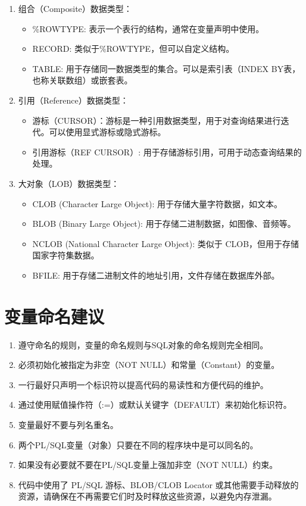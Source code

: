\documentclass[11pt, a4paper, oneside, UTF8]{ctexbook}
\begin{document}
\begin{enumerate}
  \item 组合（Composite）数据类型：
        \begin{itemize}
          \item \%ROWTYPE: 表示一个表行的结构，通常在变量声明中使用。
          \item RECORD: 类似于\%ROWTYPE，但可以自定义结构。
          \item TABLE: 用于存储同一数据类型的集合。可以是索引表（INDEX BY表，也称关联数组）或嵌套表。
        \end{itemize}
  \item 引用（Reference）数据类型：
        \begin{itemize}
          \item 游标（CURSOR）：游标是一种引用数据类型，用于对查询结果进行迭代。可以使用显式游标或隐式游标。
          \item 引用游标（REF CURSOR）: 用于存储游标引用，可用于动态查询结果的处理。
        \end{itemize}
  \item 大对象（LOB）数据类型：
        \begin{itemize}
          \item CLOB (Character Large Object): 用于存储大量字符数据，如文本。
          \item BLOB (Binary Large Object): 用于存储二进制数据，如图像、音频等。
          \item NCLOB (National Character Large Object): 类似于 CLOB，但用于存储国家字符集数据。
          \item BFILE: 用于存储二进制文件的地址引用，文件存储在数据库外部。
        \end{itemize}
\end{enumerate}
\section{变量命名建议}
\begin{enumerate}
  \item 遵守命名的规则，变量的命名规则与SQL对象的命名规则完全相同。
  \item 必须初始化被指定为非空（NOT NULL）和常量（Constant）的变量。
  \item 一行最好只声明一个标识符以提高代码的易读性和方便代码的维护。
  \item 通过使用赋值操作符（:=）或默认关键字（DEFAULT）来初始化标识符。
  \item 变量最好不要与列名重名。
  \item 两个PL/SQL变量（对象）只要在不同的程序块中是可以同名的。
  \item 如果没有必要就不要在PL/SQL变量上强加非空（NOT NULL）约束。
  \item 代码中使用了 PL/SQL 游标、BLOB/CLOB Locator 或其他需要手动释放的资源，请确保在不再需要它们时及时释放这些资源，以避免内存泄漏。
\end{enumerate}
\end{document}
